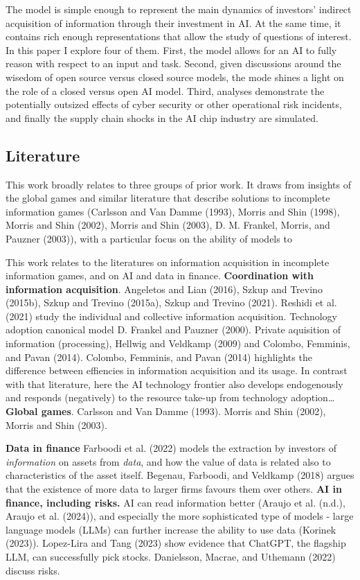 \documentclass[
]{article}
\theoremstyle{plain}
\theoremstyle{remark}
\begin{document}
The model is simple enough to represent the main dynamics of investors'
indirect acquisition of information through their investment in AI. At
the same time, it contains rich enough representations that allow the
study of questions of interest. In this paper I explore four of them.
First, the model allows for an AI to fully reason with respect to an
input and task. Second, given discussions around the wisedom of open
source versus closed source models, the mode shines a light on the role
of a closed versus open AI model. Third, analyses demonstrate the
potentially outsized effects of cyber security or other operational risk
incidents, and finally the supply chain shocks in the AI chip industry
are simulated.

\hypertarget{literature}{%
\subsection{Literature}\label{literature}}

This work broadly relates to three groups of prior work. It draws from
insights of the global games and similar literature that describe
solutions to incomplete information games (Carlsson and Van Damme
(1993), Morris and Shin (1998), Morris and Shin (2002), Morris and Shin
(2003), D. M. Frankel, Morris, and Pauzner (2003)), with a particular
focus on the ability of models to

This work relates to the literatures on information acquisition in
incomplete information games, and on AI and data in finance.
\textbf{Coordination with information acquisition}. Angeletos and Lian
(2016), Szkup and Trevino (2015b), Szkup and Trevino (2015a), Szkup and
Trevino (2021). Reshidi et al. (2021) study the individual and
collective information acquisition. Technology adoption canonical model
D. Frankel and Pauzner (2000). Private aquisition of information
(processing), Hellwig and Veldkamp (2009) and Colombo, Femminis, and
Pavan (2014). Colombo, Femminis, and Pavan (2014) highlights the
difference between effiencies in information acquisition and its usage.
In contrast with that literature, here the AI technology frontier also
develops endogenously and responds (negatively) to the resource take-up
from technology adoption\ldots{} \textbf{Global games}. Carlsson and Van
Damme (1993). Morris and Shin (2002), Morris and Shin (2003).

\textbf{Data in finance} Farboodi et al. (2022) models the extraction by
investors of \emph{information} on assets from \emph{data}, and how the
value of data is related also to characteristics of the asset itself.
Begenau, Farboodi, and Veldkamp (2018) argues that the existence of more
data to larger firms favours them over others. \textbf{AI in finance,
including risks.} AI can read information better (Araujo et al. (n.d.),
Araujo et al. (2024)), and especially the more sophisticated type of
models - large language models (LLMs) can further increase the ability
to use data (Korinek (2023)). Lopez-Lira and Tang (2023) show evidence
that ChatGPT, the flagship LLM, can successfully pick stocks.
Danielsson, Macrae, and Uthemann (2022) discuss risks.
\end{document}
